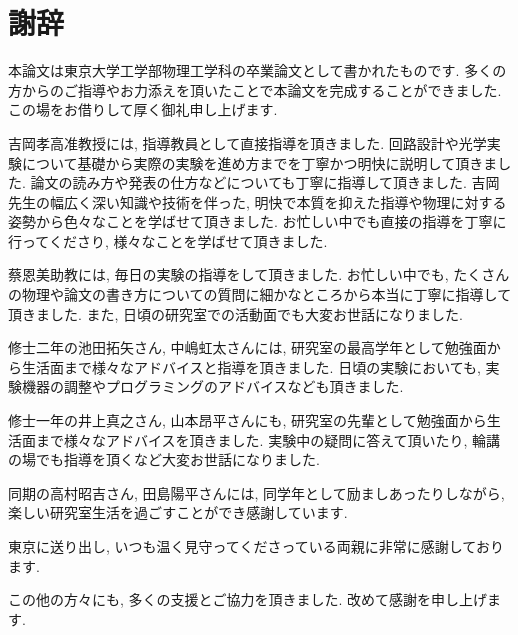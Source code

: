 \documentclass[uplatex, dvipdfmx, a4paper, report, papersize, 11pt]{jsbook}
\begin{document}
\newpage
\chapter*{謝辞}
本論文は東京大学工学部物理工学科の卒業論文として書かれたものです. 多くの方からのご指導やお力添えを頂いたことで本論文を完成することができました. この場をお借りして厚く御礼申し上げます. \par
吉岡孝高准教授には, 指導教員として直接指導を頂きました. 回路設計や光学実験について基礎から実際の実験を進め方までを丁寧かつ明快に説明して頂きました. 論文の読み方や発表の仕方などについても丁寧に指導して頂きました. 吉岡先生の幅広く深い知識や技術を伴った, 明快で本質を抑えた指導や物理に対する姿勢から色々なことを学ばせて頂きました. お忙しい中でも直接の指導を丁寧に行ってくださり, 様々なことを学ばせて頂きました. \par
蔡恩美助教には, 毎日の実験の指導をして頂きました. お忙しい中でも, たくさんの物理や論文の書き方についての質問に細かなところから本当に丁寧に指導して頂きました. また, 日頃の研究室での活動面でも大変お世話になりました. \par
修士二年の池田拓矢さん, 中嶋虹太さんには, 研究室の最高学年として勉強面から生活面まで様々なアドバイスと指導を頂きました. 日頃の実験においても, 実験機器の調整やプログラミングのアドバイスなども頂きました. \par
修士一年の井上真之さん, 山本昂平さんにも, 研究室の先輩として勉強面から生活面まで様々なアドバイスを頂きました. 実験中の疑問に答えて頂いたり, 輪講の場でも指導を頂くなど大変お世話になりました. \par
同期の高村昭吉さん, 田島陽平さんには, 同学年として励ましあったりしながら, 楽しい研究室生活を過ごすことができ感謝しています. \par
東京に送り出し, いつも温く見守ってくださっている両親に非常に感謝しております. \par
この他の方々にも, 多くの支援とご協力を頂きました. 改めて感謝を申し上げます.

\end{document}
